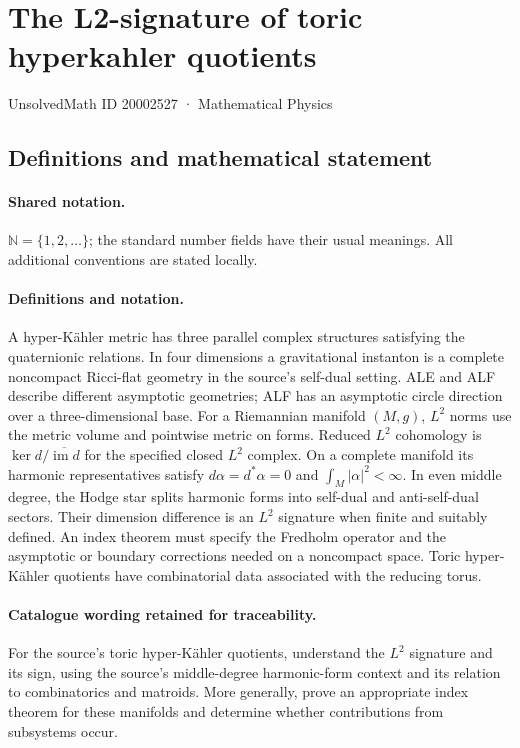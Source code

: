 \documentclass[11pt]{article}
\begin{document}
\setcounter{section}{20002526}
\section{The L2-signature of toric hyperkahler quotients}\label{20002527}
{\small UnsolvedMath ID 20002527 · Mathematical Physics}
\subsection{Definitions and mathematical statement}

\paragraph{Shared notation.}$\mathbb N=\{1,2,\ldots\}$; the standard number fields have their usual meanings. All additional conventions are stated locally.


\paragraph{Definitions and notation.}A hyper-Kähler metric has three parallel complex structures satisfying the quaternionic relations. In four dimensions a gravitational instanton is a complete noncompact Ricci-flat geometry in the source’s self-dual setting. ALE and ALF describe different asymptotic geometries; ALF has an asymptotic circle direction over a three-dimensional base. For a Riemannian manifold $(M,g)$, $L^2$ norms use the metric volume and pointwise metric on forms. Reduced $L^2$ cohomology is $\ker d/\overline{\operatorname{im}d}$ for the specified closed $L^2$ complex. On a complete manifold its harmonic representatives satisfy $d\alpha=d^*\alpha=0$ and $\int_M|\alpha|^2<\infty$. In even middle degree, the Hodge star splits harmonic forms into self-dual and anti-self-dual sectors. Their dimension difference is an $L^2$ signature when finite and suitably defined. An index theorem must specify the Fredholm operator and the asymptotic or boundary corrections needed on a noncompact space. Toric hyper-Kähler quotients have combinatorial data associated with the reducing torus.

\paragraph{Catalogue wording retained for traceability.}
For the source’s toric hyper-Kähler quotients, understand the $L^2$ signature and its sign, using the source’s middle-degree harmonic-form context and its relation to combinatorics and matroids. More generally, prove an appropriate index theorem for these manifolds and determine whether contributions from subsystems occur.
\end{document}
